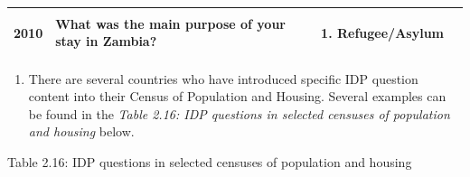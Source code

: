 \documentclass[
]{article}
\providecommand{\tightlist}{%
  \setlength{\itemsep}{0pt}\setlength{\parskip}{0pt}}
\begin{document}
\begin{longtable}[]{@{}llll@{}}
\begin{minipage}[t]{0.22\columnwidth}
2010\strut
\end{minipage} & \begin{minipage}[t]{0.22\columnwidth}\raggedright
What was the
main purpose of
your stay in
Zambia?\strut
\end{minipage} & \begin{minipage}[t]{0.22\columnwidth}\raggedright
\begin{enumerate}
\def\labelenumi{\arabic{enumi}.}
\setcounter{enumi}{4}
\tightlist
\item
  Refugee/Asylum
\end{enumerate}\strut
\end{minipage}\tabularnewline
\bottomrule
\end{longtable}

\begin{enumerate}
\def\labelenumi{\arabic{enumi}.}
\setcounter{enumi}{100}
\tightlist
\item
  There are several countries who have introduced specific IDP
  question content into their Census of Population and Housing.
  Several examples can be found in the \emph{Table 2.16: IDP questions in
  selected censuses of population and housing} below.
\end{enumerate}

Table 2.16: IDP questions in selected censuses of population and housing
\end{document}
